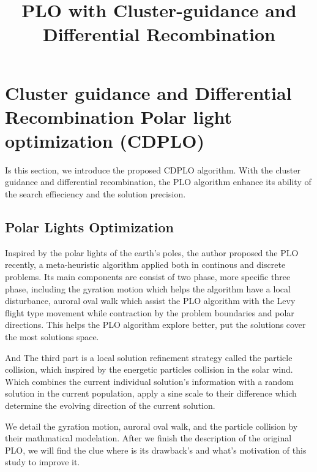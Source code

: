 \documentclass[review]{elsarticle}
\begin{document}
\begin{frontmatter}

\title{\textbf{PLO with Cluster-guidance and Differential Recombination}}

\begin{abstract}

\end{abstract}

\begin{keyword}

\end{keyword}

\end{frontmatter}

\section{Cluster guidance and Differential Recombination Polar light optimization (CDPLO)}
Is this section, we introduce the proposed CDPLO algorithm. With the cluster guidance and differential recombination, the PLO algorithm enhance its ability of the search effieciency and the solution precision.

\subsection{Polar Lights Optimization}
Inspired by the polar lights of the earth's poles, the author proposed the PLO recently, a meta-heuristic algorithm applied both in continous and discrete problems. Its main components are consist of two phase, more specific three phase, including the gyration motion which helps the algorithm have a local disturbance, auroral oval walk which assist the PLO algorithm with the Levy flight type movement while contraction by the problem boundaries and polar directions. This helps the PLO algorithm explore better, put the solutions cover the most solutions space.

And The third part is a local solution refinement strategy called the particle collision, which inspired by the energetic particles collision in the solar wind. Which combines the current individual solution's information with a random solution in the current population, apply a sine scale to their difference which determine the evolving direction of the current solution.

We detail the gyration motion, auroral oval walk, and the particle collision by their mathmatical modelation. After we finish the description of the original PLO, we will find the clue where is its drawback's and what's motivation of this study to improve it.
\end{document}
